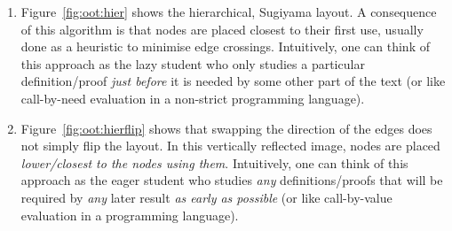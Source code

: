 \begin{enumerate}
  \item Figure~\ref{fig:oot:hier} shows the hierarchical, Sugiyama layout. A
    consequence of this algorithm is that nodes are placed closest to their
    first use, usually done as a heuristic to minimise edge crossings.
    Intuitively, one can think of this approach as the lazy student who only
    studies a particular definition/proof \emph{just before} it is needed by
    some other part of the text (or like call-by-need evaluation in a non-strict
    programming language).  

  \item Figure~\ref{fig:oot:hierflip} shows that swapping the direction of the
    edges does not simply flip the layout. In this vertically reflected image,
    nodes are placed \emph{lower/closest to the nodes using them}.  Intuitively,
    one can think of this approach as the eager student who studies \emph{any}
    definitions/proofs that will be required by \emph{any} later result \emph{as
    early as possible} (or like call-by-value evaluation in a programming
    language).  

\end{enumerate}

